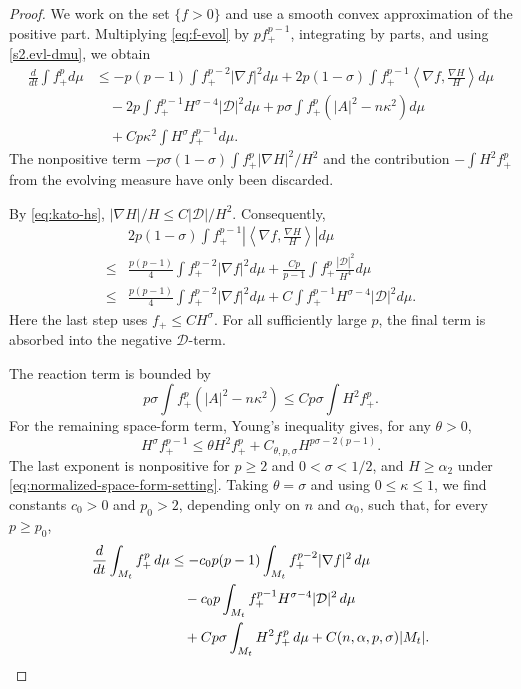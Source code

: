 \documentclass[11pt,reqno]{amsart}
\theoremstyle{definition}
\theoremstyle{remark}
\numberwithin{equation}{section}
\begin{document}
\begin{proof}
We work on the set $\{f>0\}$ and use a smooth convex approximation of the
positive part.  Multiplying \eqref{eq:f-evol} by $pf_+^{p-1}$, integrating by
parts, and using \eqref{s2.evl-dmu}, we obtain
\begin{align*}
 \frac{d}{dt}\int f_+^p d\mu
 &\leq-p(p-1)\int f_+^{p-2}|\nabla f|^2d\mu
 +2p(1-\sigma)\int f_+^{p-1}
     \left\langle\nabla f,\frac{\nabla H}{H}\right\rangle d\mu\\
 &\quad-2p\int f_+^{p-1}H^{\sigma-4}|\mathcal D|^2d\mu
 +p\sigma\int f_+^p(|A|^2-n\kappa^2)d\mu\\
 &\quad+Cp\kappa^2\int H^\sigma f_+^{p-1}d\mu.
\end{align*}
The nonpositive term
$-p\sigma(1-\sigma)\int f_+^p|\nabla H|^2/H^2$ and the contribution
$-\int H^2f_+^p$ from the evolving measure have only been discarded.

By \eqref{eq:kato-hs},
$|\nabla H|/H\leq C|\mathcal D|/H^2$.  Consequently,
\begin{align*}
 &2p(1-\sigma)\int f_+^{p-1}
   \left|\left\langle\nabla f,\frac{\nabla H}{H}\right\rangle\right|d\mu\\
 \leq&\frac{p(p-1)}4\int f_+^{p-2}|\nabla f|^2d\mu
 +\frac{Cp}{p-1}\int f_+^p\frac{|\mathcal D|^2}{H^4}d\mu\\
 \leq&\frac{p(p-1)}4\int f_+^{p-2}|\nabla f|^2d\mu
 +C\int f_+^{p-1}H^{\sigma-4}|\mathcal D|^2d\mu.
\end{align*}
Here the last step uses $f_+\leq CH^\sigma$.  For all sufficiently large
$p$, the final term is absorbed into the negative $\mathcal D$-term.

The reaction term is bounded by
\begin{equation*}
 p\sigma\int f_+^p(|A|^2-n\kappa^2)
 \leq Cp\sigma\int H^2f_+^p.
\end{equation*}
For the remaining space-form term, Young's inequality gives, for any
$\theta>0$,
\begin{equation*}
 H^\sigma f_+^{p-1}
 \leq\theta H^2f_+^p
 +C_{\theta,p,\sigma}H^{p\sigma-2(p-1)}.
\end{equation*}
The last exponent is nonpositive for $p\geq2$ and
$0<\sigma<1/2$, and $H\geq\alpha_2$ under
\eqref{eq:normalized-space-form-setting}.  Taking $\theta=\sigma$ and using
$0\leq\kappa\leq1$, we find constants $c_0>0$ and $p_0>2$, depending only
on $n$ and $\alpha_0$, such that, for every $p\geq p_0$,
\begin{align}
 \frac{d}{dt}\int_{M_t}f_+^p\,d\mu
 &\leq-c_0p(p-1)\int_{M_t}f_+^{p-2}|\nabla f|^2\,d\mu\notag\\
 &\quad-c_0p\int_{M_t}f_+^{p-1}H^{\sigma-4}
                  |\mathcal D|^2\,d\mu\notag\\
 &\quad+Cp\sigma\int_{M_t}H^2f_+^p\,d\mu
       +C(n,\alpha,p,\sigma)|M_t|.
 \label{eq:first-lp}
\end{align}


\end{proof}
\end{document}
